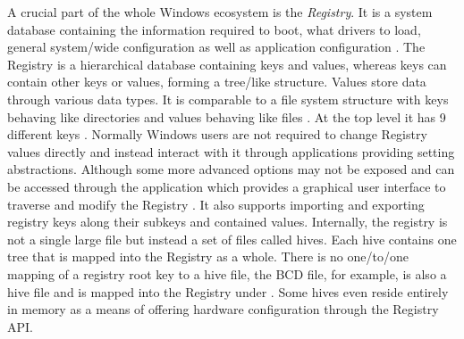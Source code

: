 A crucial part of the whole Windows ecosystem is the \emph{Registry}.
It is a system database containing the information required to boot, what drivers to load, general system\-/wide configuration as well as application configuration \cite[Section 1]{windows-internals-7-part1}.
The Registry is a hierarchical database containing keys and values, whereas keys can contain other keys or values, forming a tree\-/like structure.
Values store data through various data types.
It is comparable to a file system structure with keys behaving like directories and values behaving like files \cite[Section 10]{windows-internals-7-part2}.
At the top level it has 9 different keys \cite[Section 10]{windows-internals-7-part2}.
Normally Windows users are not required to change Registry values directly and instead interact with it through applications providing setting abstractions.
Although some more advanced options may not be exposed and can be accessed through the  application which provides a graphical user interface to traverse and modify the Registry \cite[Section 10]{windows-internals-7-part2}.
It also supports importing and exporting registry keys along their subkeys and contained values.
Internally, the registry is not a single large file but instead a set of files called hives.
Each hive contains one tree that is mapped into the Registry as a whole.
There is no one\-/to\-/one mapping of a registry root key to a hive file, the \ac{BCD} file, for example, is also a hive file and is mapped into the Registry under  \cite[Section 10]{windows-internals-7-part2}.
Some hives even reside entirely in memory as a means of offering hardware configuration through the Registry \ac{API}.

